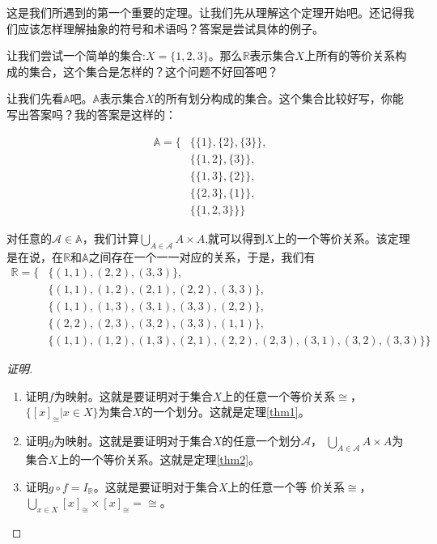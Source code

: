 \documentclass{book}[oneside]
\begin{document}
\begin{CJK*}{UTF8}{gbsn}
  这是我们所遇到的第一个重要的定理。让我们先从理解这个定理开始吧。还记得我们应该怎样理解抽象的符号和术语吗？答案是尝试具体的例子。

  让我们尝试一个简单的集合:$X=\{1,2,3\}$。那么$\mathbb{R}$表示集合$X$上所有的等价关系构成的集合，这个集合是怎样的？这个问题不好回答吧？

  让我们先看$\mathbb{A}$吧。$\mathbb{A}$表示集合$X$的所有划分构成的集合。这个集合比较好写，你能写出答案吗？我的答案是这样的：

  \begin{equation*}
    \begin{split}
      \mathbb{A}=\{&\{\{1\},\{2\},\{3\}\},\\
      &\{\{1,2\},\{3\}\},\\
      &\{\{1,3\},\{2\}\},\\
      &\{\{2,3\},\{1\}\},\\
      &\{\{1,2,3\}\}\}
    \end{split}
  \end{equation*}

  对任意的$\mathscr{A}\in \mathbb{A}$，我们计算$\bigcup_{A \in \mathscr{A}}A\times A$,就可以得到$X$上的一个等价关系。该定理是在说，在$\mathbb{R}$和$\mathbb{A}$之间存在一个一一对应的关系，于是，我们有
  \begin{equation*}
    \begin{split}
      \mathbb{R}=\{&\{(1,1),(2,2),(3,3)\},\\
      &\{(1,1),(1,2),(2,1),(2,2),(3,3)\},\\
      &\{(1,1),(1,3),(3,1),(3,3),(2,2)\},\\
      &\{(2,2),(2,3),(3,2),(3,3),(1,1)\},\\
      &\{(1,1),(1,2),(1,3),(2,1),(2,2),(2,3),(3,1),(3,2),(3,3)\}\}      
    \end{split}
  \end{equation*}
  \begin{proof}[证明]
    \begin{enumerate}
    \item 证明$f$为映射。这就是要证明对于集合$X$上的任意一个等价关系$\cong$，　
      $\{[x]_{\cong}|x\in X\}$为集合$X$的一个划分。这就是定理\ref{thm1}。
    \item 证明$g$为映射。这就是要证明对于集合$X$的任意一个划分$\mathscr{A}$，
      $\bigcup_{A\in \mathscr{A}}A\times A$为集合$X$上的一个等价关系。这就是定理\ref{thm2}。
    \item 证明$g\circ f = I_{\mathbb{R}}$。这就是要证明对于集合$X$上的任意一个等
      价关系$\cong$，$\bigcup_{x\in X}[x]_{\cong}\times [x]_{\cong} = \cong$。


\end{enumerate}
\end{proof}
\end{CJK*}
\end{document}
